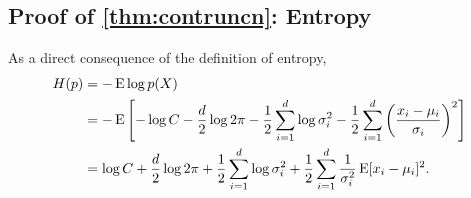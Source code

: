 \subsection{Proof of \cref{thm:contruncn}: Entropy}

As a direct consequence of the definition of entropy,
\begin{align*}
    H(p) 
    &= -\E \log p(X) \\
    &= -\E \left[-\log C - \half[d] \log 2\pi - \half \sum_{i=1}^d \log \sigma_i^2 - \half \sum_{i=1}^d \left( \frac{x_i - \mu_i}{\sigma_i} \right)^2 \right] \\
    &= \log C + \half[d] \log 2\pi + \half \sum_{i=1}^d \log \sigma_i^2 + \half \sum_{i=1}^d \frac{1}{\sigma_i^2} \E [ x_i - \mu_i ]^2.
  \end{align*}

